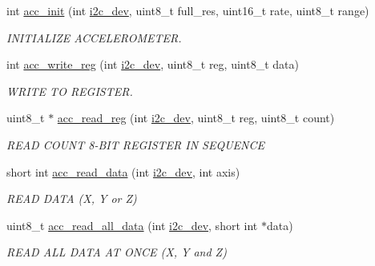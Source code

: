 \begin{DoxyCompactItemize}
\item 
int \hyperlink{group__acc_gae8f9cc6e0d15e61039d846305f86f073}{acc\-\_\-init} (int \hyperlink{CommunicationV0_2communication_8c_a7751bd45ac1064efb35adf1f19c25db8}{i2c\-\_\-dev}, uint8\-\_\-t full\-\_\-res, uint16\-\_\-t rate, uint8\-\_\-t range)
\begin{DoxyCompactList}\small\item\em I\-N\-I\-T\-I\-A\-L\-I\-Z\-E A\-C\-C\-E\-L\-E\-R\-O\-M\-E\-T\-E\-R. \end{DoxyCompactList}\item 
int \hyperlink{group__acc_ga534116416343122de29a5b6ade6876bd}{acc\-\_\-write\-\_\-reg} (int \hyperlink{CommunicationV0_2communication_8c_a7751bd45ac1064efb35adf1f19c25db8}{i2c\-\_\-dev}, uint8\-\_\-t reg, uint8\-\_\-t data)
\begin{DoxyCompactList}\small\item\em W\-R\-I\-T\-E T\-O R\-E\-G\-I\-S\-T\-E\-R. \end{DoxyCompactList}\item 
uint8\-\_\-t $\ast$ \hyperlink{group__acc_ga2a91c44eebbe44f4d3b8c508633512f9}{acc\-\_\-read\-\_\-reg} (int \hyperlink{CommunicationV0_2communication_8c_a7751bd45ac1064efb35adf1f19c25db8}{i2c\-\_\-dev}, uint8\-\_\-t reg, uint8\-\_\-t count)
\begin{DoxyCompactList}\small\item\em R\-E\-A\-D C\-O\-U\-N\-T 8-\/\-B\-I\-T R\-E\-G\-I\-S\-T\-E\-R I\-N S\-E\-Q\-U\-E\-N\-C\-E \end{DoxyCompactList}\item 
short int \hyperlink{group__acc_ga041d6953f2bfc8c5efa4d5bbac812305}{acc\-\_\-read\-\_\-data} (int \hyperlink{CommunicationV0_2communication_8c_a7751bd45ac1064efb35adf1f19c25db8}{i2c\-\_\-dev}, int axis)
\begin{DoxyCompactList}\small\item\em R\-E\-A\-D D\-A\-T\-A (X, Y or Z) \end{DoxyCompactList}\item 
uint8\-\_\-t \hyperlink{group__acc_ga013bb5ed8a763883fc440549d2b1a6ce}{acc\-\_\-read\-\_\-all\-\_\-data} (int \hyperlink{CommunicationV0_2communication_8c_a7751bd45ac1064efb35adf1f19c25db8}{i2c\-\_\-dev}, short int $\ast$data)
\begin{DoxyCompactList}\small\item\em R\-E\-A\-D A\-L\-L D\-A\-T\-A A\-T O\-N\-C\-E (X, Y and Z) \end{DoxyCompactList}\item 

\end{DoxyCompactItemize}
